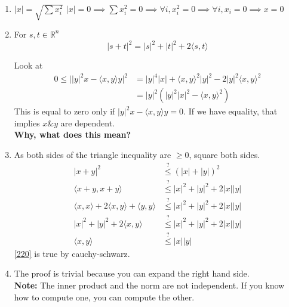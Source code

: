 \documentclass[a4paper]{article}
\numberwithin{equation}{section}
\begin{document}
\begin{proposition}
    \begin{prooof}
        \begin{enumerate}
            \item $|x|=\sqrt{\sum x_i^2}$
            $|x|=0\implies\sum x_i^2=0\implies\forall i, x_i^2=0\implies \forall i,x_i=0\implies x=0$
            \item 
            For $s,t\in\mathbb R^n$
            \begin{equation}
                |s+t|^2=|s|^2+|t|^2+2\langle s,t \rangle
            \end{equation}
    
            Look at 
            \begin{align}
                0\leq\Big||y|^2x-\langle x,y\rangle y\Big|^2&=|y|^4|x|+\langle x,y\rangle^2|y|^2-2|y|^2\langle x,y\rangle^2\\
                &=|y|^2\left(|y|^2|x|^2-\langle x,y \rangle^2\right)
            \end{align}
            This is equal to zero only if $|y|^2x-\langle x,y\rangle y=0$. If we have equality, that implies $x\&y$ are dependent.
            \\\textbf{Why, what does this mean?}
            \item {}
            As both sides of the triangle inequality are $\geq0$, square both sides.
            \begin{align}
                |x+y|^2&\stackrel{?}{\leq}(|x|+|y|)^2\\
                \langle x+y, x+y \rangle&\stackrel{?}{\leq}|x|^2+|y|^2+2|x||y|\\
                \langle x,x\rangle + 2\langle x,y\rangle + \langle y,y\rangle &\stackrel{?}{\leq}|x|^2+|y|^2+2|x||y|\\
                |x|^2+|y|^2+2\langle x,y\rangle &\stackrel{?}{\leq}|x|^2+|y|^2+2|x||y|\\
                \langle x,y\rangle &\stackrel{?}{\leq}|x||y|\label{220}
            \end{align}
            \eqref{220} is true by cauchy-schwarz.
            \item The proof is trivial because you can expand the right hand side.
            \\\textbf{Note:} The inner product and the norm are not independent. If you know how to compute one, you can compute the other.
        \end{enumerate}
    \end{prooof}
\end{proposition}
\end{document}
